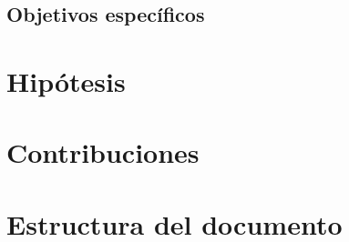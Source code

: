 \subsection{Objetivos específicos}

\section{Hipótesis}

\section{Contribuciones}

\section{Estructura del documento}
